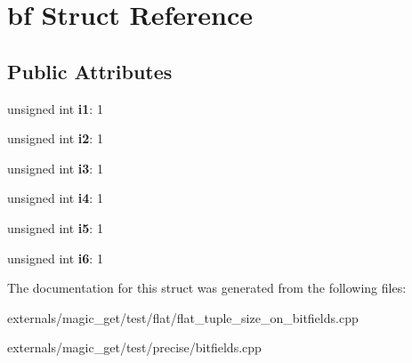 \hypertarget{structbf}{}\section{bf Struct Reference}
\label{structbf}
\subsection*{Public Attributes}
\begin{DoxyCompactItemize}
\item 
\mbox{\label{structbf_a2e2b8b5ed8212e513419114b9f0f4a0d}} 
unsigned int {\bfseries i1}\+: 1
\item 
\mbox{\label{structbf_aad2e11b2c4e3849c68c8c82112bee8a1}} 
unsigned int {\bfseries i2}\+: 1
\item 
\mbox{\label{structbf_a97a72bf23d0f37c83b9467ee1a6a7cf6}} 
unsigned int {\bfseries i3}\+: 1
\item 
\mbox{\label{structbf_a0dc86c779e060d3019bd61532ffdb9ae}} 
unsigned int {\bfseries i4}\+: 1
\item 
\mbox{\label{structbf_a9f2f32e24b63c5d7c5151f0dcbb5817d}} 
unsigned int {\bfseries i5}\+: 1
\item 
\mbox{\label{structbf_af40222c8719eeb12ebc3b2c75ec4c099}} 
unsigned int {\bfseries i6}\+: 1
\end{DoxyCompactItemize}


The documentation for this struct was generated from the following files\+:\begin{DoxyCompactItemize}
\item 
externals/magic\+\_\+get/test/flat/flat\+\_\+tuple\+\_\+size\+\_\+on\+\_\+bitfields.\+cpp\item 
externals/magic\+\_\+get/test/precise/bitfields.\+cpp\end{DoxyCompactItemize}

